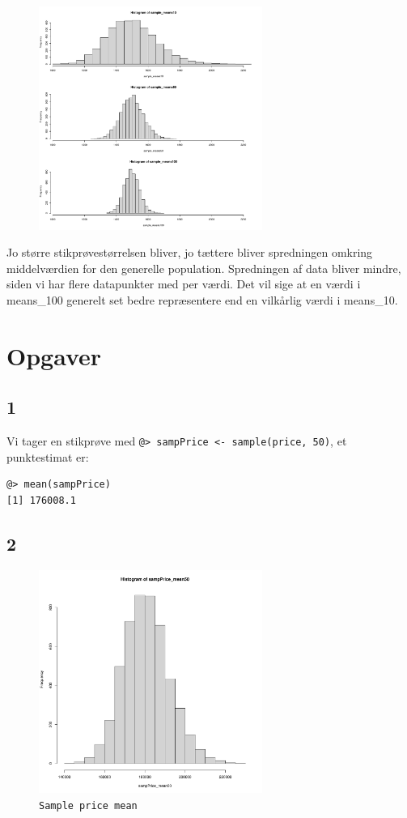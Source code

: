 \documentclass{article}
\begin{document}
\begin{figure}[H]
  \centering
  \includegraphics[width=0.65\textwidth]{../sample_means_all.pdf}
\end{figure}
Jo større stikprøvestørrelsen bliver, jo tættere bliver spredningen omkring
middelværdien for den generelle population. Spredningen af data bliver mindre,
siden vi har flere datapunkter med per værdi. Det vil sige at en værdi i
means\_100 generelt set bedre repræsentere end en vilkårlig værdi i means\_10.


\section{Opgaver}

\subsection{1}
Vi tager en stikprøve med \texttt{@> sampPrice <- sample(price, 50)}, et
punktestimat er: 
\begin{lstlisting}
@> mean(sampPrice)
[1] 176008.1
\end{lstlisting}

\subsection{2}
\begin{figure}[H]
  \centering
  \includegraphics[width=0.65\textwidth]{../sampPrice_mean50.pdf}
  \caption{\texttt{Sample price mean}}
\end{figure}
\end{document}
